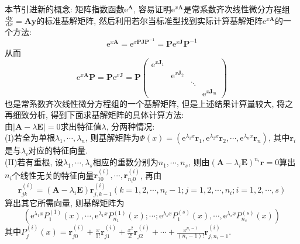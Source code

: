 \documentclass[titlepage,11pt,a4paper,twoside]{report}
\newcommand\diff{\,\mathrm{d}}
\newcommand\e{\mathrm{e}}
\begin{document}
本节引进新的概念: 矩阵指数函数$\e^{\bm{A}}$, 容易证明$\e^{x\bm{A}}$是常系数齐次线性微分方程组$\displaystyle\frac{\diff\bm{y}}{\diff x}=\bm{A}\bm{y}$的标准基解矩阵, 然后利用若尔当标准型找到实际计算基解矩阵$\e^{x\bm{A}}$的一个方法:\[\e^{x\bm{A}}=\e^{x\bm{P}\bm{J}\bm{P}^{-1}}=\bm{P}\e^{x\bm{J}}\bm{P}^{-1}\]
从而\[\e^{x\bm{A}}\bm{P}=\bm{P}\e^{x\bm{J}}=\bm{P}\begin{pmatrix}
\e^{x\bm{J}_1}&&&\\&\e^{x\bm{J}_2}&&\\&&\ddots&\\&&&\e^{x\bm{J}_m}
\end{pmatrix}\]
也是常系数齐次线性微分方程组的一个基解矩阵, 但是上述结果计算量较大, 将之再细致分析, 得到下面求基解矩阵的具体计算方法:\\
由$|\bm{A}-\lambda\bm{E}|=0$求出特征值$\lambda$, 分两种情况:\\
(I)若全为单根$\lambda_1,\cdots,\lambda_n$, 则基解矩阵为$\bm{\mathit{\Phi}}(x)=\left(\e^{\lambda_1x}\bm{r}_1,\e^{\lambda_2x}\bm{r}_2,\cdots,\e^{\lambda_nx}\bm{r}_n\right)$, 其中$\bm{r}_i$是与$\lambda_i$对应的特征向量.\\
(II)若有重根, 设$\lambda_1,\cdots,\lambda_s$相应的重数分别为$n_1,\cdots,n_s$, 则由$(\bm{A}-\lambda_i\bm{E})^{n_i}\bm{r}=0$算出$n_i$个线性无关的特征向量$\bm{r}_{10}^{(i)},\cdots,\bm{r}_{n_i0}^{(i)}$, 再由
\[\bm{r}_{jk}^{(i)}=(\bm{A}-\lambda_i\bm{E})\bm{r}_{j,k-1}^{(i)}(k=1,2,\cdots,n_i-1;j=1,2,\cdots,n_i;i=1,2,\cdots,s)\]
算出其它所需向量, 则基解矩阵为
\[\left(\e^{\lambda_1x}P_1^{(1)}(x),\cdots,\e^{\lambda_1x}P_{n_1}^{(1)}(x);\cdots;\e^{\lambda_sx}P_1^{(s)}(x),\cdots,\e^{\lambda_sx}P_{n_s}^{(s)}(x)\right)\]
其中$\displaystyle P_j^{(i)}(x)=\bm{r}_{j0}^{(i)}+\frac{x}{1!}\bm{r}_{j1}^{(i)}+\frac{x^2}{2!}\bm{r}_{j2}^{(i)}+\cdots+\frac{x^{n_i-1}}{(n_i-1)!}\bm{r}_{j,n_i-1}^{(i)}$.
\end{document}
